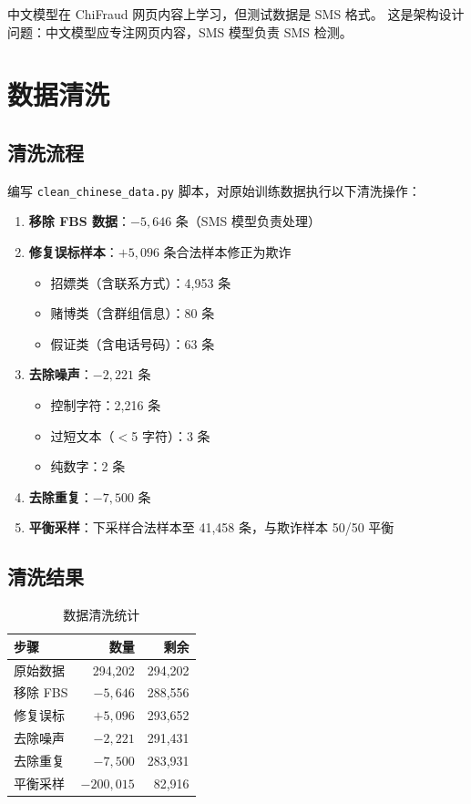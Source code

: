 \documentclass[11pt,a4paper]{article}
\begin{document}
中文模型在 ChiFraud 网页内容上学习，但测试数据是 SMS 格式。
这是架构设计问题：中文模型应专注网页内容，SMS 模型负责 SMS 检测。

\section{数据清洗}

\subsection{清洗流程}

编写 \texttt{clean\_chinese\_data.py} 脚本，对原始训练数据执行以下清洗操作：

\begin{enumerate}
  \item \textbf{移除 FBS 数据}：$-5,646$ 条（SMS 模型负责处理）
  \item \textbf{修复误标样本}：$+5,096$ 条合法样本修正为欺诈
  \begin{itemize}
    \item 招嫖类（含联系方式）：4,953 条
    \item 赌博类（含群组信息）：80 条
    \item 假证类（含电话号码）：63 条
  \end{itemize}
  \item \textbf{去除噪声}：$-2,221$ 条
  \begin{itemize}
    \item 控制字符：2,216 条
    \item 过短文本（$<$5 字符）：3 条
    \item 纯数字：2 条
  \end{itemize}
  \item \textbf{去除重复}：$-7,500$ 条
  \item \textbf{平衡采样}：下采样合法样本至 41,458 条，与欺诈样本 50/50 平衡
\end{enumerate}

\subsection{清洗结果}

\begin{table}[H]
\centering
\caption{数据清洗统计}
\begin{tabular}{lrr}
\toprule
步骤 & 数量 & 剩余 \\
\midrule
原始数据 & 294,202 & 294,202 \\
移除 FBS & $-5,646$ & 288,556 \\
修复误标 & $+5,096$ & 293,652 \\
去除噪声 & $-2,221$ & 291,431 \\
去除重复 & $-7,500$ & 283,931 \\
平衡采样 & $-200,015$ & 82,916 \\
\bottomrule
\end{tabular}
\end{table}
\end{document}
